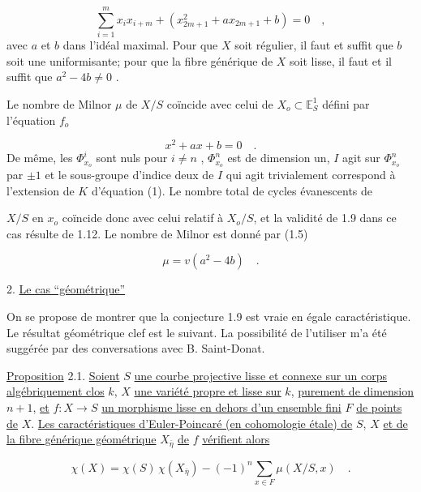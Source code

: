 \begin{equation*}
\sum_{i=1}^{m} x_ix_{i+m} + (x_{2m+1}^2 + ax_{2m+1} + b) = 0 \quad ,
\end{equation*}
avec $a$ et $b$ dans l'idéal maximal. Pour que $X$ soit régulier, il faut et suffit que $b$ soit une uniformisante; pour que la fibre générique de $X$ soit lisse, il faut et il suffit que $a^2 - 4b \neq 0$ .

Le nombre de Milnor $\mu$ de $X/S$ coïncide avec celui de $X_o \subset \mathbb{E}_S^1$ défini par l'équation $f_o$

\begin{equation}\tag{1}
x^2 + ax + b = 0 \quad .
\end{equation}
De même, les $\Phi^i_{x_o}$ sont nuls pour $i \neq n$ , $\Phi^n_{x_o}$ est de dimension un, $I$ agit sur $\Phi^n_{x_o}$ par $\pm 1$ et le sous-groupe d'indice deux de $I$ qui agit trivialement correspond à l'extension de $K$ d'équation (1). Le nombre total de cycles évanescents de 



$X/S$ en $x_o$ coïncide donc avec celui relatif à $X_o/S$, et la validité de 1.9 dans ce cas résulte de 1.12. Le nombre de Milnor est donné par (1.5)

\begin{equation}\tag{1.13.1}
\mu=v(a^2-4b) \quad .
\end{equation}

2. \underline{Le cas ``géométrique''}

On se propose de montrer que la conjecture 1.9 est vraie en égale caractéristique. Le résultat géométrique clef est le suivant. La possibilité de l'utiliser m'a été suggérée par des conversations avec B. Saint-Donat.

\underline{Proposition} 2.1. \underline{Soient} $S$ \underline{une courbe projective lisse et connexe sur un corps algébriquement clos} $k$, $X$ \underline{une variété propre et lisse sur} $k$, \underline{purement de dimension} $n+1$, \underline{et} $f:X\to S$ \underline{un morphisme lisse en dehors d'un ensemble fini} $F$ \underline{de points de} $X$. \underline{Les caractéristiques d'Euler-Poincaré (en cohomologie étale) de} $S$, $X$ \underline{et de la fibre générique géométrique} $X_{\bar\eta}$ \underline{de} $f$ \underline{vérifient alors}

\begin{equation}\tag{2.1.1}
\chi(X)=\chi(S)\,\chi(X_{\bar\eta})-(-1)^n\sum_{x\in F}\mu(X/S,x) \quad .
\end{equation}

